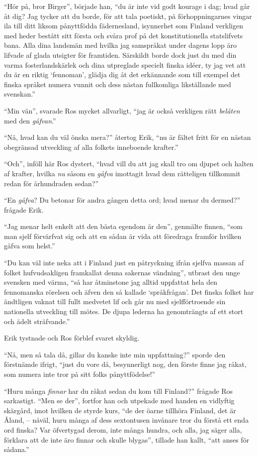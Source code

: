 ``Hör på, bror Birger'', började han, ``du är inte vid godt kourage i
dag; hvad går åt dig? Jag tycker att du borde, för att tala poetiskt, på
förhoppningarnes vingar ila till ditt liksom pånyttfödda fädernesland,
isynnerhet som Finland verkligen med heder bestått sitt första och svåra
prof på det konstitutionella statslifvets bana. Alla dina landsmän med
hvilka jag samspråkat under dagens lopp äro lifvade af glada utsigter
för framtiden. Särskildt borde dock just du med din varma
fosterlandskärlek och dina utpreglade specielt finska idéer, ty jag vet
att du är en riktig `fennoman', glädja dig åt det erkännande som till
exempel det finska språket numera vunnit och dess nästan fullkomliga
likställande med svenskan.''

``Min vän'', svarade Ros mycket allvarligt, ``jag är också verkligen
rätt \emph{belåten} med den \emph{gåfvan}.''

``Nå, hvad kan du väl önska mera?'' återtog Erik, ``nu är fältet fritt
för en nästan obegränsad utveckling af alla folkets inneboende
krafter.''

``Och'', inföll här Ros dystert, ``hvad vill du att jag skall tro om
djupet och halten af krafter, hvilka \emph{nu} såsom en \emph{gåfva}
imottagit hvad dem rätteligen tillkommit redan för århundraden sedan?''

``En \emph{gåfva}? Du betonar för andra gången detta ord; hvad menar du
dermed?'' frågade Erik.

``Jag menar helt enkelt att den bästa egendom är den'', genmälte finnen,
``som man sjelf förvärfvat sig och att en sådan är vida att föredraga
framför hvilken gåfva som helst.''

``Du kan väl inte neka att i Finland just en påtryckning ifrån sjelfva
massan af folket hufvudsakligen framkallat denna sakernas vändning'',
utbrast den unge svensken med värma, ``så har åtminstone jag alltid
uppfattat hela den fennomanska rörelsen och äfven den så kallade
`språkfrågan'. Det finska folket har ändtligen vaknat till fullt
medvetet lif och går nu med sjelfförtroende sin nationella utveckling
till mötes. De djupa lederna ha genomträngts af ett stort och ädelt
sträfvande.''

Erik tystnade och Ros förblef svaret skyldig.

``Nå, men så tala då, gillar du kanske inte min uppfattning?'' sporde
den förstnämde ifrigt, ``just du vore då, besynnerligt nog, den förste
finne jag råkat, som numera inte tror på sitt folks pånyttfödelse!''

``Huru många \emph{finnar} har du råkat sedan du kom till Finland?''
frågade Ros sarkastigt. ``Men se der'', fortfor han och utpekade med
handen en vidlyftig skärgård, imot hvilken de styrde kurs, ``de der
öarne tillhöra Finland, det är Åland, -- nåväl, huru många af dess
sextontusen invånare tror du förstå ett enda ord finska? Var öfvertygad
derom, inte många hundra, och alla, jag säger alla, förklara att de inte
äro finnar och skulle blygas'', tillade han kallt, ``att anses för
sådana.''

